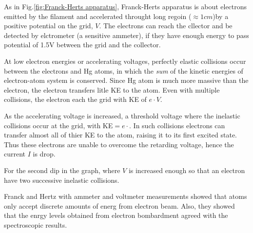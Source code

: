         As in Fig.\eqref{fig:Franck-Herts apparatus}, Franck-Herts apparatus is about electrons emitted by the filament and accelerated throught long regoin 
        ($\approx 1 cm$)by a positive potential on the grid, $V$. The electrons can reach the cllector and be detected by elctrometer (a sensitive ammeter), if they 
        have enough energy to pass potential of 1.5V between the grid and the collector.

        \bulletpar At low electron energies or accelerating voltages, perfectly elastic collisions occur between the electrons and Hg atoms, in which the 
        \textit{sum} of the kinetic energies of electron-atom system is conserved. Since Hg atom is much more massive than the electron, the electron transfers 
        litle KE to the atom. Even with multiple collisions, the electron each the grid with KE of $e \cdot V$.

        \bulletpar As the accelerating voltage is increased, a threshold voltage where the inelastic collisions occur at the grid, with KE$=e \cdot$. In such collisions
        electrons can transfer almost all of thier KE to the atom, raising it to its first excited state. Thus these electrons are unable to overcome the retarding 
        voltage, hence the current $I$ is drop. 
        
        \bulletpar For the second dip in the graph, where $V$ is increased enough so that an electron have two successive inelastic collisions.

        \bulletpar Franck and Hertz with ammeter and voltmeter measurements showed that atoms only accept discrete amounts of energ from electron beam.
        Also, they showed that the enrgy levels obtained from electron bombardment agreed with the spectroscopic results.





